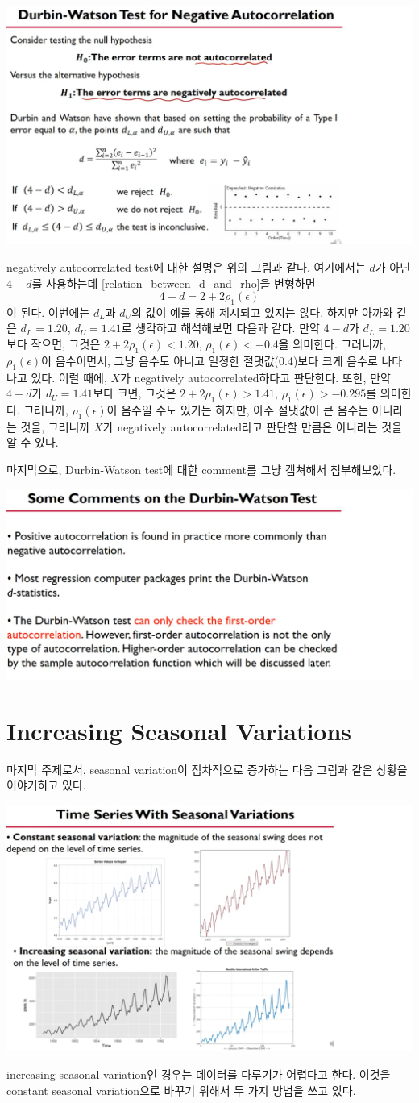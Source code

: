 \documentclass{article}
\begin{document}
\begin{center}
\includegraphics[width=.5\textwidth]{negatively_autocorrelated_test}
\end{center}

negatively autocorrelated test에 대한 설명은 위의 그림과 같다.
여기에서는 \(d\)가 아닌 \(4-d\)를 사용하는데 \eqref{relation_between_d_and_rho}을 변형하면
\[4-d=2+2\rho_1(\epsilon)\]
이 된다.
이번에는 \(d_L\)과 \(d_U\)의 값이 예를 통해 제시되고 있지는 않다.
하지만 아까와 같은 \(d_L=1.20\), \(d_U=1.41\)로 생각하고 해석해보면 다음과 같다.
만약 \(4-d\)가 \(d_L=1.20\)보다 작으면, 그것은 \(2+2\rho_1(\epsilon)<1.20\), \(\rho_1(\epsilon)<-0.4\)을 의미한다.
그러니까, \(\rho_1(\epsilon)\)이 음수이면서, 그냥 음수도 아니고 일정한 절댓값(0.4)보다 크게 음수로 나타나고 있다.
이럴 때에, \(X\)가 negatively autocorrelated하다고 판단한다.
또한, 만약 \(4-d\)가 \(d_U=1.41\)보다 크면, 그것은 \(2+2\rho_1(\epsilon)>1.41\), \(\rho_1(\epsilon)>-0.295\)를 의미힌다.
그러니까, \(\rho_1(\epsilon)\)이 음수일 수도 있기는 하지만, 아주 절댓값이 큰 음수는 아니라는 것을, 그러니까 \(X\)가 negatively autocorrelated라고 판단할 만큼은 아니라는 것을 알 수 있다.

마지막으로, Durbin-Watson test에 대한 comment를 그냥 캡쳐해서 첨부해보았다.

\begin{center}
\includegraphics[width=.5\textwidth]{comment_on_DWtest}
\end{center}

\section{Increasing Seasonal Variations}
마지막 주제로서, seasonal variation이 점차적으로 증가하는 다음 그림과 같은 상황을 이야기하고 있다.
\begin{center}
\includegraphics[width=.5\textwidth]{increasing_seasonal_variation}
\end{center}
increasing seasonal variation인 경우는 데이터를 다루기가 어렵다고 한다.
이것을 constant seasonal variation으로 바꾸기 위해서 두 가지 방법을 쓰고 있다.
\end{document}
